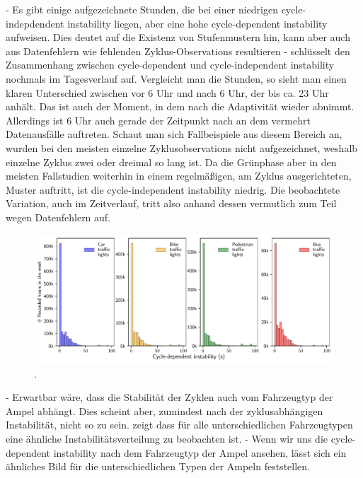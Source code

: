 - Es gibt einige aufgezeichnete Stunden, die bei einer niedrigen cycle-indepdendent instability liegen, aber eine hohe cycle-dependent instability aufweisen. Dies deutet auf die Existenz von Stufenmustern hin, kann aber auch aus Datenfehlern wie fehlenden Zyklus-Observations resultieren
-  schlüsselt den Zusammenhang zwischen cycle-dependent und cycle-independent instability nochmals im Tagesverlauf auf. Vergleicht man die Stunden, so sieht man einen klaren Unterschied zwischen vor 6 Uhr und nach 6 Uhr, der bis ca. 23 Uhr anhält. Das ist auch der Moment, in dem nach  die Adaptivität wieder abnimmt. Allerdings ist 6 Uhr auch gerade der Zeitpunkt nach  an dem vermehrt Datenausfälle auftreten. Schaut man sich Fallbeispiele aus diesem Bereich an, wurden bei den meisten einzelne Zyklusobservations nicht aufgezeichnet, weshalb einzelne Zyklus zwei oder dreimal so lang ist. Da die Grünphase aber in den meisten Fallstudien weiterhin in einem regelmäßigen, am Zyklus ausgerichteten, Muster auftritt, ist die cycle-independent instability niedrig. Die beobachtete Variation, auch im Zeitverlauf, tritt also anhand dessen vermutlich zum Teil wegen Datenfehlern auf.

\begin{figure}[t]
    \centering
    \includegraphics[width=\linewidth]{images/predictability-by-lanes.pdf}
    \caption{.}\label{fig:predictability-by-lanes}
\end{figure}

- Erwartbar wäre, dass die Stabilität der Zyklen auch vom Fahrzeugtyp der Ampel abhängt. Dies scheint aber, zumindest nach der zyklusabhängigen Instabilität, nicht so zu sein.  zeigt dass für alle unterschiedlichen Fahrzeugtypen eine ähnliche Instabilitätsverteilung zu beobachten ist. 
- Wenn wir uns die cycle-dependent instability nach dem Fahrzeugtyp der Ampel ansehen, lässt sich ein ähnliches Bild für die unterschiedlichen Typen der Ampeln feststellen.

